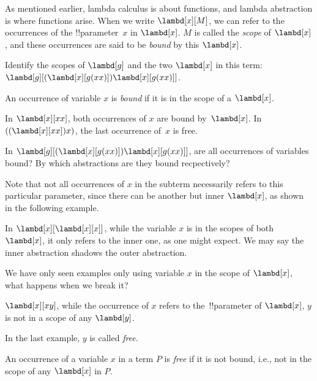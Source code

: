 \documentclass[../../../include/open-logic-section]{subfiles}
\begin{document}

As mentioned earlier, lambda calculus is about functions, and lambda
abstraction is where functions arise. When we write $\lambd[x][M]$, we
can refer to the occurrences of the !!{parameter}~$x$ in
$\lambd[x]$. $M$ is called the \emph{scope} of $\lambd[x]$, and these
occurrences are said to be \emph{bound} by this $\lambd[x]$.

\begin{prob}
Identify the scopes of $\lambd[g]$ and the two $\lambd[x]$ in this
term: $\lambd[g][(\lambd[x][g (x x)]) \lambd[x][g (x x)]]$.
\end{prob}

\begin{defn}
  An occurrence of variable $x$ is \emph{bound} if it is in the scope
  of a $\lambd[x]$.
\end{defn}

\begin{ex}
  In $\lambd[x][x x]$, both occurrences of $x$ are bound
  by~$\lambd[x]$.  In $((\lambd[x][xx])x)$, the last occurrence of~$x$
  is free.
\end{ex}

\begin{prob}
  In $\lambd[g][(\lambd[x][g (x x)]) \lambd[x][g (x x)]]$, are all
  occurrences of variables bound? By which abstractions are they
  bound recpectively?
\end{prob}

Note that not all occurrences of $x$ in the subterm necessarily refers to this particular parameter,
since there can be another but inner $\lambd[x]$, as shown in the
following example. 
\begin{ex}
In $\lambd[x][\lambd[x][x]]$, while the variable $x$ is in the
scopes of both $\lambd[x]$, it only refers to the inner one, as one
might expect. We may say the inner abstraction shadows the outer
abstraction.
\end{ex}

We have only seen examples only using variable $x$ in the scope of $\lambd[x]$, 
what happens when we break it?
\begin{ex}
  $\lambd[x][x y]$, while the occurrence of $x$ refers to the~!!{parameter} of $\lambd[x]$, $y$ is not in a scope
  of any $\lambd[y]$. 
\end{ex}

In the last example, $y$ is called \emph{free}. 
\begin{defn}
  An occurrence of a variable $x$ in a term $P$ is \emph{free} if it is not bound, i.e., not in the scope of any
  $\lambd[x]$ in $P$.
\end{defn}
\end{document}
